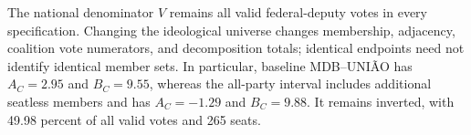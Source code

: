 \documentclass[11pt]{article}
\begin{document}

The national denominator \(V\) remains all valid federal-deputy votes in every
specification. Changing the ideological universe changes membership, adjacency,
coalition vote numerators, and decomposition totals; identical endpoints need
not identify identical member sets. In particular, baseline MDB--UNIÃO has
\(A_C=2.95\) and \(B_C=9.55\), whereas the all-party interval includes additional
seatless members and has \(A_C=-1.29\) and \(B_C=9.88\). It remains inverted,
with 49.98 percent of all valid votes and 265 seats.
\end{document}
